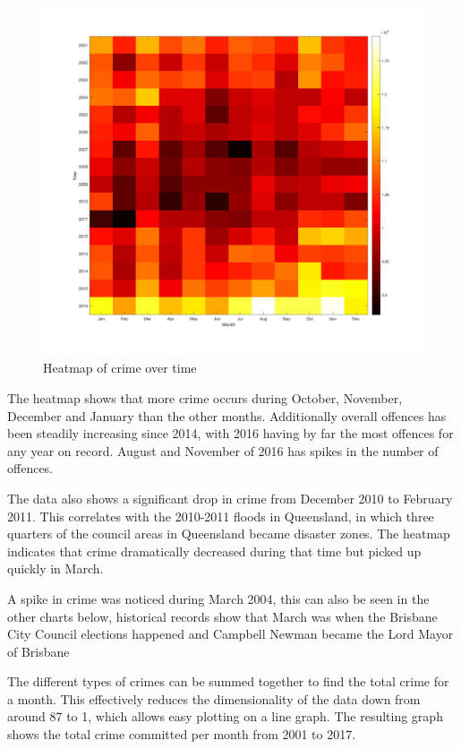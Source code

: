 \documentclass[]{article}
\begin{document}
\begin{figure}[H]
    \caption{Heatmap of crime over time}
    \centering
    \includegraphics[width=\linewidth]{../images/crime_time_heatmap}
\end{figure}

The heatmap shows that more crime occurs during October, November, December and January than the other months. 
Additionally overall offences has been steadily increasing since 2014, with
2016 having by far the most offences for any year on record.
August and November of 2016 has spikes in the number of offences.

The data also shows a significant drop in crime from December 2010 to February 2011.
This correlates with the 2010-2011 floods in Queensland, in which three quarters of the council areas
in Queensland became disaster zones\cite{noauthor_201011_2017}.
The heatmap indicates that crime dramatically decreased during that time but picked up quickly in March.

A spike in crime was noticed during March 2004, this can also be seen in the other charts below, historical records show that March was when the Brisbane City Council elections happened and Campbell Newman became the Lord Mayor of Brisbane\cite{noauthor_2004_2017}

The different types of crimes can be summed together to find the total crime for a month.
This effectively reduces the dimensionality of the data down from around 87 to 1, which allows easy plotting on a line graph.
The resulting graph shows the total crime committed per month from 2001 to 2017.
\end{document}
